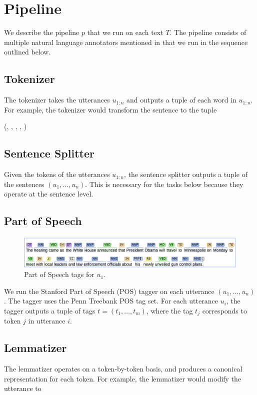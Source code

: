 
\section{Pipeline}
We describe the pipeline $p$ that we run on each text $T$. The pipeline
consists of multiple natural language annotators mentioned in 
\citep{manning2014stanford} that we run in 
the sequence outlined below.

\subsection{Tokenizer}
The tokenizer takes the utterances $u_{1:n}$ and outputs a tuple of
each word in $u_{1:n}$. For example, the tokenizer would transform
the sentence  to the tuple
\begin{center}
  (, , , , )
\end{center}
\subsection{Sentence Splitter}
Given the tokens of the utterances $u_{1:n}$, the sentence splitter outputs
a tuple of the sentences $(u_1,\dots,u_n)$. This is necessary
for the tasks below because they operate at the sentence level.

\subsection{Part of Speech}

\begin{figure}
\includegraphics[scale=0.33]{figures/pos.png}
\caption{
\label{fig:pos}
Part of Speech tags for $u_1$.
}
\end{figure}

We run the Stanford Part of Speech (POS) tagger \citep{toutanova2003tagger}
on each utterance $(u_1,\dots,u_n)$. The tagger uses the Penn Treebank
POS tag set. For each utterance $u_i$, the
tagger outputs a tuple of tags $t=(t_1,\dots,t_m)$, where the 
tag $t_j$ corresponds to token $j$ in utterance $i$.

\subsection{Lemmatizer}
The lemmatizer operates on a token-by-token basis, and 
produces a canonical representation for each token. For 
example, the lemmatizer would modify the utterance
 to 

